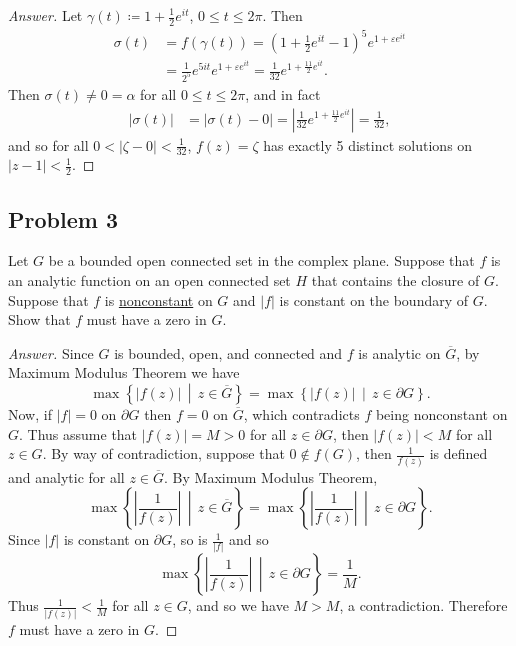 \documentclass[12pt]{article}
\newcommand\paren[1]{\left( #1 \right)}
\newcommand\setb[1]{\left \{ #1 \right \}}
\newcommand{\abs}[1]{\left| #1 \right|}
\newcommand{\eps}{\varepsilon}
\theoremstyle{definition}
\begin{document}
\begin{proof}[Answer]
    Let $\gamma(t) \coloneqq 1 + \frac{1}{2}e^{it}$, $0 \leq t \leq 2\pi$. Then 
    \begin{align*}
        \sigma(t) & = f \paren{ \gamma(t) } = \paren{ 1 + \frac{1}{2}e^{it} - 1 }^5 e^{1 + \eps e^{it}} \\
        & = \frac{1}{2^5} e^{5it} e^{1 + \eps e^{it}} = \frac{1}{32} e^{ 1 + \frac{11}{2} e^{it}}.
    \end{align*}
    Then $\sigma(t) \neq 0 = \alpha$ for all $0 \leq t \leq 2\pi$, and in fact
    \begin{align*}
        \abs{ \sigma(t) } & = \abs{ \sigma(t) - 0 } = \abs{ \frac{1}{32} e^{ 1 + \frac{11}{2} e^{it}} } = \frac{1}{32},
    \end{align*}
    and so for all $0 < |\zeta - 0| < \frac{1}{32}$, $f(z) = \zeta$ has exactly 5 distinct solutions on $|z-1| < \frac{1}{2}$.
\end{proof}
\subsection{Problem 3 \texorpdfstring{\cite{Conway}}{}}
Let $G$ be a bounded open connected set in the complex plane. Suppose that $f$ is an analytic function on an open connected set $H$ that contains the closure of $G$. Suppose that $f$ is \underline{nonconstant} on $G$ and $|f|$ is constant on the boundary of $G$. Show that $f$ must have a zero in $G$.
\begin{proof}[Answer]
    Since $G$ is bounded, open, and connected and $f$ is analytic on $\overline{G}$, by Maximum Modulus Theorem we have
    \[
        \max \setb{ \abs{f(z)} \, \middle| \, z \in \overline{G} } = \max \setb{ \abs{f(z)} \, \middle| \, z \in \partial G }.
    \]
    Now, if $|f| = 0$ on $\partial G$ then $f = 0$ on $\overline{G}$, which contradicts $f$ being nonconstant on $G$. Thus assume that $|f(z)| = M > 0$ for all $z \in \partial G$, then $|f(z)| < M$ for all $z \in G$. By way of contradiction, suppose that $0 \notin f(G)$, then $\frac{1}{f(z)}$ is defined and analytic for all $z \in \overline{G}$. By Maximum Modulus Theorem,
    \[
        \max \setb{ \abs{\frac{1}{f(z)}} \, \middle| \, z \in \overline{G} } = \max \setb{ \abs{\frac{1}{f(z)}} \, \middle| \, z \in \partial G }.
    \]
    Since $|f|$ is constant on $\partial G$, so is $\frac{1}{|f|}$ and so 
    \[
        \max \setb{ \abs{\frac{1}{f(z)}} \, \middle| \, z \in \partial G } = \frac{1}{M}.
    \]
    Thus $\frac{1}{|f(z)|} < \frac{1}{M}$ for all $z \in G$, and so we have $M > M$, a contradiction. Therefore $f$ must have a zero in $G$.
\end{proof}
\end{document}
